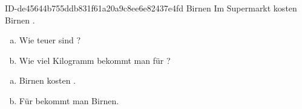 \begin{exercise}
      {ID-de45644b755ddb831f61a20a9c8ee6e82437e4fd}
      {Birnen}
  \ifproblem\problem
    Im Supermarkt kosten  Birnen .
    \begin{enumerate}[a)]
      \item Wie teuer sind ?
      \item Wie viel Kilogramm bekommt man für ?
    \end{enumerate}
  \fi
  \ifoutcome\outcome
    \begin{enumerate}[a)]
      \item {} Birnen kosten .
      \item Für  bekommt man  Birnen.
    \end{enumerate}
  \fi
\end{exercise}
